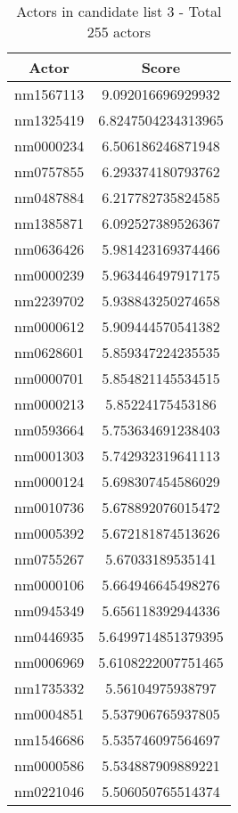 \begin{table}[H]
    \centering
        \begin{tabular}{ |c|c| } 
            \hline
            \textbf{Actor} & \textbf{Score} \\ 
            \hline 
            nm1567113 & 9.092016696929932 \\
            nm1325419 & 6.8247504234313965 \\
            nm0000234 & 6.506186246871948 \\
            nm0757855 & 6.293374180793762 \\
            nm0487884 & 6.217782735824585 \\
            nm1385871 & 6.092527389526367 \\
            nm0636426 & 5.981423169374466 \\
            nm0000239 & 5.963446497917175 \\
            nm2239702 & 5.938843250274658 \\
            nm0000612 & 5.909444570541382 \\
            nm0628601 & 5.859347224235535 \\
            nm0000701 & 5.854821145534515 \\
            nm0000213 & 5.85224175453186 \\
            nm0593664 & 5.753634691238403 \\
            nm0001303 & 5.742932319641113 \\
            nm0000124 & 5.698307454586029 \\
            nm0010736 & 5.678892076015472 \\
            nm0005392 & 5.672181874513626 \\
            nm0755267 & 5.67033189535141 \\
            nm0000106 & 5.664946645498276 \\
            nm0945349 & 5.656118392944336 \\
            nm0446935 & 5.6499714851379395 \\
            nm0006969 & 5.6108222007751465 \\
            nm1735332 & 5.56104975938797 \\
            nm0004851 & 5.537906765937805 \\
            nm1546686 & 5.535746097564697 \\
            nm0000586 & 5.534887909889221 \\
            nm0221046 & 5.506050765514374 \\
            \hline
        \end{tabular}
    \caption{Actors in candidate list 3 - Total 255 actors}
\end{table}